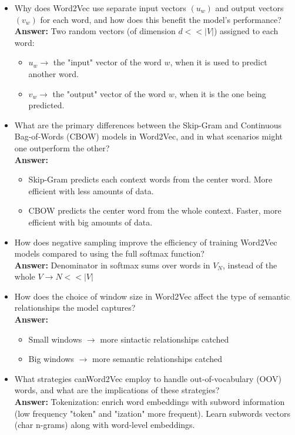 \documentclass{article}
\begin{document}
	\begin{itemize}
		\item Why does Word2Vec use separate input vectors $(u_w)$ and output vectors
$(v_w)$ for each word, and how does this benefit the model’s performance?\\
\textbf{Answer:} Two random vectors (of dimension $d << |V|$) assigned to each word:
		\begin{itemize}
			\item $u_w \rightarrow$ the "input" vector of the word $w$, when it is used to predict another word.
			\item $v_w \rightarrow$ the "output" vector of the word $w$, when it is the one being predicted.
		\end{itemize}

		\item What are the primary differences between the Skip-Gram and Continuous
Bag-of-Words (CBOW) models in Word2Vec, and in what scenarios might
one outperform the other?\\
\textbf{Answer:}
		\begin{itemize} 
			\item Skip-Gram predicts each context words from the center word. More efficient with less amounts of data.
		       	\item CBOW predicts the center word from the whole context. Faster, more efficient with big amounts of data.
		\end{itemize}

		\item How does negative sampling improve the efficiency of training Word2Vec
models compared to using the full softmax function?\\
\textbf{Answer:} Denominator in softmax sums over words in $V_N$, instead of the whole $V \rightarrow N<<|V|$

		\item How does the choice of window size in Word2Vec affect the type of semantic
relationships the model captures?\\
\textbf{Answer:}
		\begin{itemize}
			\item Small windows $\rightarrow$ more sintactic relationships catched
			\item Big windows $\rightarrow$ more semantic relationships catched
		\end{itemize}

		\item What strategies canWord2Vec employ to handle out-of-vocabulary (OOV)
words, and what are the implications of these strategies?\\
\textbf{Answer:} Tokenization: enrich word embeddings with subword information (low frequency "token" and "ization" more frequent). Learn subwords vectors (char n-grams) along with word-level embeddings.
	\end{itemize}
\end{document}
